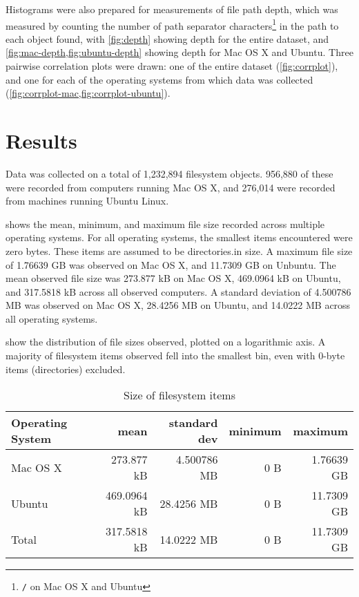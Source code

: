 \documentclass[12pt,letterpaper]{article}
\begin{document}
			Histograms were also prepared for measurements of file path depth, which was measured by counting the number of path separator characters\footnote{\texttt{/} on Mac OS X and Ubuntu} in the path to each object found, with \cref{fig:depth} showing depth for the entire dataset, and \cref{fig:mac-depth,fig:ubuntu-depth}  showing depth for Mac OS X and Ubuntu. Three pairwise correlation plots were drawn: one of the entire dataset (\cref{fig:corrplot}), and one for each of the operating systems from which data was collected (\cref{fig:corrplot-mac,fig:corrplot-ubuntu}).

	\section{Results}

		Data was collected on a total of 1,232,894 filesystem objects. 956,880 of these were recorded from computers running Mac OS X, and 276,014 were recorded from machines running Ubuntu Linux.

		 shows the mean, minimum, and maximum file size recorded across multiple operating systems. For all operating systems, the smallest items encountered were zero bytes. These items are assumed to be directories.in size. A maximum file size of 1.76639 GB was observed on Mac OS X, and 11.7309 GB on Unbuntu.  The mean observed file size was 273.877 kB on Mac OS X, 469.0964 kB on Ubuntu, and 317.5818 kB across all observed computers. A standard deviation of 4.500786 MB was observed on Mac OS X, 28.4256 MB on Ubuntu, and 14.0222 MB across all operating systems.

		 show the distribution of file sizes observed, plotted on a logarithmic axis. A majority of filesystem items observed fell into the smallest bin, even with 0-byte items (directories) excluded.

		\begin{table}[h]
		\caption{Size of filesystem items}
		\label{table:size}
			\begin{tabular}{l r r r r}
			Operating System & mean  & standard dev & minimum & maximum \\
			\hline
			Mac OS X & 273.877 kB & 4.500786 MB & 0 B & 1.76639 GB \\
			Ubuntu & 469.0964 kB & 28.4256 MB & 0 B & 11.7309 GB \\
			Total  & 317.5818 kB & 14.0222 MB & 0 B & 11.7309 GB \\
			\end{tabular}
		\end{table}
\end{document}
